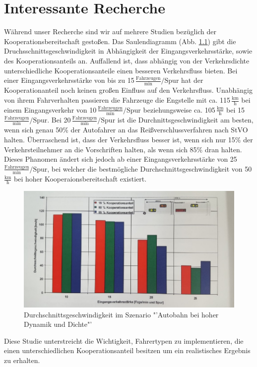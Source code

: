 \chapter{Interessante Recherche}
Während unser Recherche sind wir auf mehrere Studien \cite[S.129]{Benmimoun.2004} bezüglich der Kooperationsbereitschaft gestoßen. Das Saulendiagramm (Abb. \ref{fig:kooperation}) gibt die Druchsschnittsgeschwindigkeit in Abhängigkeit der Eingangsverkehrsstärke, sowie des Kooperationsanteils an. Auffallend ist, dass abhängig von der Verkehrsdichte unterschiedliche Kooperationsanteile einen besseren Verkehrsfluss bieten. Bei einer Eingangsverkehrsstärke von bis zu 15\,$\frac{\text{Fahrzeugen}}{\text{min}}/\text{Spur}$ hat der Kooperationanteil noch keinen großen Einfluss auf den Verkehrsfluss. Unabhängig von ihrem Fahrverhalten passieren die Fahrzeuge die Engstelle mit ca. 115\,$\frac{\text{km}}{\text{h}}$ bei einem Eingangsverkehr von 10\,$\frac{\text{Fahrzeugen}}{\text{min}}/\text{Spur}$ beziehungsweise ca. 105\,$\frac{\text{km}}{\text{h}}$ bei 15\,$\frac{\text{Fahrzeugen}}{\text{min}}/\text{Spur}$.
Bei 20\,$\frac{\text{Fahrzeugen}}{\text{min}}/\text{Spur}$ ist die Durchnittsgeschwindigkeit am besten, wenn sich genau 50\% der Autofahrer an das Reißverschlussverfahren nach StVO halten. Überraschend ist, dass der Verkehrsfluss besser ist, wenn sich nur 15\% der Verkehrsteilnehmer an die Vorschriften halten, als wenn sich 85\% dran halten. Dieses Phanomen ändert sich jedoch ab einer Eingangsverkehrsstärke von 25\,$\frac{\text{Fahrzeugen}}{\text{min}}/\text{Spur}$, bei welcher die bestmögliche Durchschnittsgeschwindigkeit von 50\,$\frac{\text{km}}{\text{h}}$ bei hoher Kooperaionsbereitschaft existiert.\\
\begin{figure}
	\centering
	\includegraphics[width=0.6\linewidth]{images/Kooperation}
	\caption{Durchschnittsgeschwindigkeit im Szenario "'Autobahn bei hoher Dynamik und Dichte"'}
	\label{fig:kooperation}
\end{figure}
Diese Studie unterstreicht die Wichtigkeit, Fahrertypen zu implementieren, die einen unterschiedlichen Kooperationsanteil besitzen um ein realistisches Ergebnis zu erhalten.